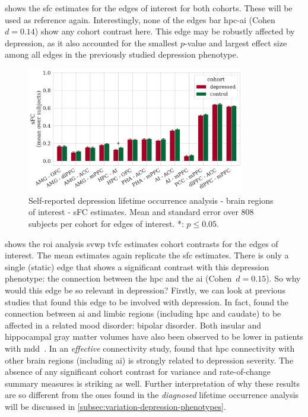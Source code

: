  shows the \gls{sfc} estimates for the edges of interest for both cohorts.
These will be used as reference again.
%
Interestingly, none of the edges bar \gls{hpc}-\gls{ai} (Cohen~$d = 0.14$) show any cohort contrast here.
This edge may be robustly affected by depression, as it also accounted for the smallest $p$-value and largest effect size among all edges in the previously studied depression phenotype.


\begin{figure}[h]
  \centering
  \includegraphics[width=0.85\textwidth]{fig/ukbiobank/TVFC_predictions_summaries/lifetime_occurrence/cohort_comparison/ROI/correlation_TVFC_mean_sFC_edges_of_interest}
  \caption{
    Self-reported depression lifetime occurrence analysis - brain regions of interest - sFC estimates.
    Mean and standard error over 808 subjects per cohort for edges of interest.
    *: $p \leq 0.05$.
  }
  \label{fig:ukb-results-lo-roi-cohort-comparison-edges-of-interest-sfc}
\end{figure}


 shows the \gls{roi} analysis \gls{svwp} \gls{tvfc} estimates cohort contrasts for the edges of interest.
%
The mean estimates again replicate the \gls{sfc} estimates.
There is only a single (static) edge that shows a significant contrast with this depression phenotype: the connection between the \gls{hpc} and the \gls{ai} (Cohen~$d = 0.15$).
So why would this edge be so relevant in depression?
Firstly, we can look at previous studies that found this edge to be involved with depression.
In fact, \textcite{Ellard2019} found the connection between \gls{ai} and limbic regions (including \gls{hpc} and caudate) to be affected in a related mood disorder: bipolar disorder.
Both insular and hippocampal gray matter volumes have also been observed to be lower in patients with \gls{mdd}~\parencite{Stratmann2014}.
In an \emph{effective} connectivity study, \textcite{Kandilarova2018} found that \gls{hpc} connectivity with other brain regions (including \gls{ai}) is strongly related to depression severity.
%
The absence of any significant cohort contrast for variance and rate-of-change summary measures is striking as well.
%
Further interpretation of why these results are so different from the ones found in the \emph{diagnosed} lifetime occurrence analysis will be discussed in \cref{subsec:variation-depression-phenotypes}.


